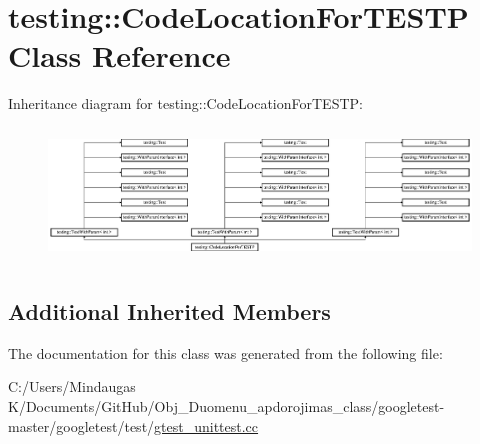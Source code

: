 \hypertarget{classtesting_1_1_code_location_for_t_e_s_t_p}{}\section{testing\+::Code\+Location\+For\+T\+E\+S\+TP Class Reference}
\label{classtesting_1_1_code_location_for_t_e_s_t_p}
Inheritance diagram for testing\+::Code\+Location\+For\+T\+E\+S\+TP\+:\begin{figure}[H]
\begin{center}
\leavevmode
\includegraphics[height=3.572568cm]{d6/d88/classtesting_1_1_code_location_for_t_e_s_t_p}
\end{center}
\end{figure}
\subsection*{Additional Inherited Members}


The documentation for this class was generated from the following file\+:\begin{DoxyCompactItemize}
\item 
C\+:/\+Users/\+Mindaugas K/\+Documents/\+Git\+Hub/\+Obj\+\_\+\+Duomenu\+\_\+apdorojimas\+\_\+class/googletest-\/master/googletest/test/\mbox{\hyperlink{googletest-master_2googletest_2test_2gtest__unittest_8cc}{gtest\+\_\+unittest.\+cc}}\end{DoxyCompactItemize}
